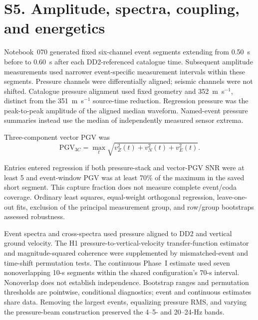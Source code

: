 \documentclass[]{seismica}
\begin{document}
\FloatBarrier

\FloatBarrier

\section*{S5. Amplitude, spectra, coupling, and energetics}
\label{sec:supp_energy}

Notebook~070 generated fixed six-channel event segments extending from 0.50~s
before to 0.60~s after each DD2-referenced catalogue time. Subsequent amplitude
measurements used narrower event-specific measurement intervals within these
segments. Pressure channels were differentially aligned; seismic channels were
not shifted. Catalogue pressure alignment used fixed geometry and
352~m~s$^{-1}$, distinct from the 351~m~s$^{-1}$ source-time reduction.
Regression pressure was the peak-to-peak amplitude of the aligned median
waveform. Named-event pressure summaries instead use the median of independently
measured sensor extrema.

Three-component vector PGV was
\begin{equation}
 \mathrm{PGV}_{3C}=\max_t\sqrt{v_Z^2(t)+v_N^2(t)+v_E^2(t)}.
\end{equation}

Entries entered regression if both pressure-stack and vector-PGV SNR were at
least 5 and event-window PGV was at least 70\% of the maximum in the saved
short segment. This capture fraction does not measure complete event/coda
coverage. Ordinary least squares, equal-weight orthogonal regression,
leave-one-out fits, exclusion of the principal measurement group, and
row/group bootstraps assessed robustness.

Event spectra and cross-spectra used pressure aligned to DD2 and vertical
ground velocity. The H1 pressure-to-vertical-velocity transfer-function
estimator and magnitude-squared coherence were supplemented by
mismatched-event and time-shift permutation tests. The continuous Phase~I
estimate used seven nonoverlapping 10-s segments within the shared
configuration's 70-s interval. Nonoverlap does not establish independence.
Bootstrap ranges and permutation thresholds are pointwise, conditional
diagnostics; event and continuous estimates share data. Removing the largest
events, equalizing pressure RMS, and varying the pressure-beam construction
preserved the 4--5- and 20--24-Hz bands.
\end{document}
